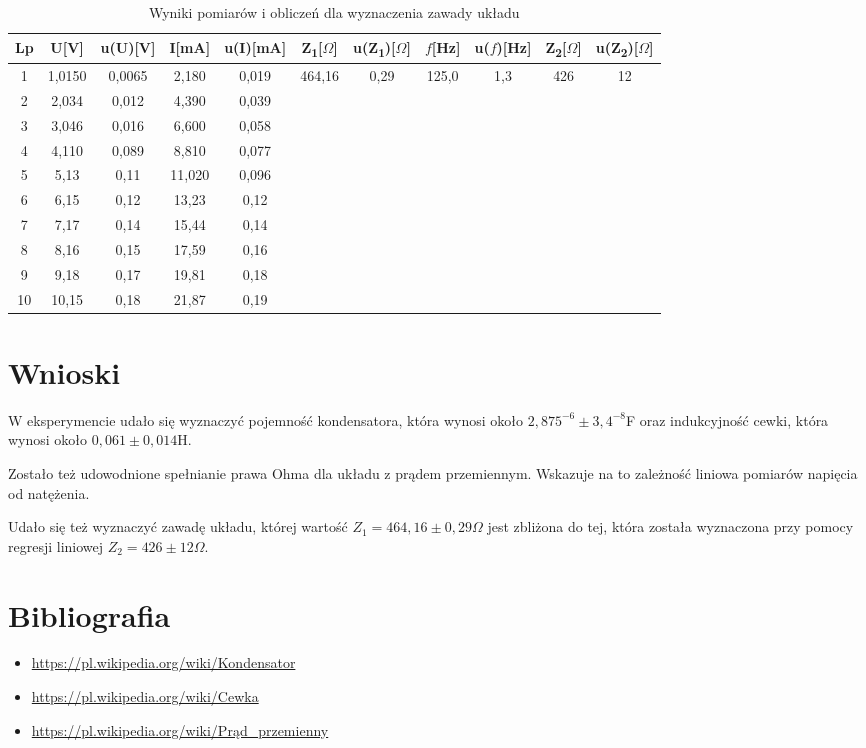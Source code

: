 \documentclass[12pt]{article}
\begin{document}
\begin{table}[h]
    \centering
    \caption{Wyniki pomiarów i obliczeń dla wyznaczenia zawady układu}
    \begin{tabular}{|c|c|c|c|c|c|c|c|c|c|c|}
    \hline
    Lp & U[V] & u(U)[V] & I[mA] & u(I)[mA] & Z\textsubscript{1}[$\Omega$] & u(Z\textsubscript{1})[$\Omega$] & $f$[Hz] & u($f$)[Hz] & Z\textsubscript{2}[$\Omega$] & u(Z\textsubscript{2})[$\Omega$] \\ \hline
    1 & 1,0150 & 0,0065 & 2,180 & 0,019 & \multirow{10}{*}{464,16} & \multirow{10}{*}{0,29} & \multirow{10}{*}{125,0} & \multirow{10}{*}{1,3} & \multirow{10}{*}{426} & \multirow{10}{*}{12} \\ \cline{1-5}
    2 & 2,034 & 0,012 & 4,390 & 0,039 & ~ & ~ & ~ & ~ & ~ & ~ \\ \cline{1-5}
    3 & 3,046 & 0,016 & 6,600 & 0,058 & ~ & ~ & ~ & ~ & ~ & ~ \\ \cline{1-5}
    4 & 4,110 & 0,089 & 8,810 & 0,077 & ~ & ~ & ~ & ~ & ~ & ~ \\ \cline{1-5}
    5 & 5,13 & 0,11 & 11,020 & 0,096 & ~ & ~ & ~ & ~ & ~ & ~ \\ \cline{1-5}
    6 & 6,15 & 0,12 & 13,23 & 0,12 & ~ & ~ & ~ & ~ & ~ & ~ \\ \cline{1-5}
    7 & 7,17 & 0,14 & 15,44 & 0,14 & ~ & ~ & ~ & ~ & ~ & ~ \\ \cline{1-5}
    8 & 8,16 & 0,15 & 17,59 & 0,16 & ~ & ~ & ~ & ~ & ~ & ~ \\ \cline{1-5}
    9 & 9,18 & 0,17 & 19,81 & 0,18 & ~ & ~ & ~ & ~ & ~ & ~ \\ \cline{1-5}
    10 & 10,15 & 0,18 & 21,87 & 0,19 & ~ & ~ & ~ & ~ & ~ & ~ \\ \hline
    \end{tabular}
\end{table}

\pagebreak

\section{Wnioski}

W eksperymencie udało się wyznaczyć pojemność kondensatora, która wynosi około $2,875^{-6} \pm 3,4^{-8}$F oraz indukcyjność cewki,
która wynosi około $ 0,061 \pm 0,014 $H.

Zostało też udowodnione spełnianie prawa Ohma dla układu z prądem przemiennym. Wskazuje na to zależność liniowa pomiarów napięcia od natężenia.

Udało się też wyznaczyć zawadę układu, której wartość $Z_1 = 464,16 \pm 0,29 \Omega$ jest zbliżona do tej, która została wyznaczona przy pomocy regresji liniowej
$Z_2 = 426 \pm 12 \Omega $.

\section{Bibliografia}

\begin{itemize}
    \item \url{https://pl.wikipedia.org/wiki/Kondensator}
    \item \url{https://pl.wikipedia.org/wiki/Cewka}
    \item \url{https://pl.wikipedia.org/wiki/Prąd_przemienny}
\end{itemize}
\end{document}
